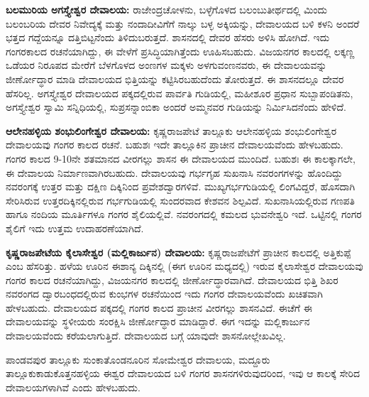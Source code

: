 \vskip -1pt

\textbf{ಬಲಮುರಿಯ ಅಗಸ್ತ್ಯೇಶ್ವರ ದೇವಾಲಯ:} ರಾಜೇಂದ್ರಚೋಳನು, ಬಳ್ಳೆಗೊಳದ ಬಲಂಬುತೀರ್ಥದಲ್ಲಿ ಮಿಂದು ಬಲಂಬರಿಯ ದೇವರ ನಿವೇದ್ಯಕ್ಕೆ ಮತ್ತು ನಂದಾದೀವಿಗೆಗೆ ನಾಲ್ಕು ಬಳ್ಳ ಅಕ್ಕಿಯನ್ನು, ದೇವಾಲಯದ ಬಳಿ ಕಳನಿ ಅಂದರೆ ಭತ್ತದ ಗದ್ದೆಯನ್ನೂ ದತ್ತಿಬಿಟ್ಟನೆಂದು ತಿಳಿದುಬರುತ್ತದೆ. ಶಾಸನದಲ್ಲಿ ದೇವರ ಹೆಸರು ಅಳಿಸಿ ಹೋಗಿದೆ. ಇದು ಗಂಗರಕಾಲದ ರಚನೆಯಾಗಿದ್ದು, ಈ ವೇಳೆಗೆ ಪ್ರಸಿದ್ಧಿಯಾಗಿತ್ತೆಂದು ಊಹಿಸಬಹುದು. ವಿಜಯನಗರ ಕಾಲದಲ್ಲಿ ಲಕ್ಕಣ್ಣ ಒಡೆಯರ ನಿರೂಪದ ಮೇರೆಗೆ ಬೆಳಗೊಳದ ಅಂಣಗಳ ಮಕ್ಕಳು ಅಳಗುವಂಣನವರು, ಈ ದೇವಾಲಯವನ್ನು ಜೀರ್ಣೋದ್ಧಾರ ಮಾಡಿ ದೇವಾಲಯದ ಭಿತ್ತಿಯನ್ನು ಕಟ್ಟಿಸಿರಬಹುದೆಂದು ತೋರುತ್ತದೆ. ಈ ಶಾಸನದಲ್ಲೂ ದೇವರ ಹೆಸರಿಲ್ಲ. ಅಗಸ್ತ್ಯೇಶ್ವರ ದೇವಾಲಯದ ಪಕ್ಕದಲ್ಲಿರುವ ಪಾರ್ವತಿ ಗುಡಿಯಲ್ಲಿ, ಮಹೀಶೂರ ಪ್ರಧಾನ ಸುಬ್ಬಾಪಂಡಿತನು, ಅಗಸ್ತ್ಯೇಶ್ವರ ಸ್ವಾಮಿ ಸನ್ನಿಧಿಯಲ್ಲಿ, ಸುಪ್ರಸನ್ನಾಂಬಿಕಾ ಅಂದರೆ ಅಮ್ಮನವರ ಗುಡಿಯನ್ನು ನಿರ್ಮಿಸಿದನೆಂದು ಹೇಳಿದೆ.

\vskip -1pt

\textbf{ಆಲೇನಹಳ್ಳಿಯ ಶಂಭುಲಿಂಗೇಶ್ವರ ದೇವಾಲಯ:} ಕೃಷ್ಣರಾಜಪೇಟೆ ತಾಲ್ಲೂಕು ಆಲೇನಹಳ್ಳಿಯ ಶಂಭುಲಿಂಗೇಶ್ವರ ದೇವಾಲಯವು ಗಂಗರ ಕಾಲದ ರಚನೆ. ಬಹುಶಃ ಇದೇ ತಾಲ್ಲೂಕಿನ ಪ್ರಾಚೀನ ದೇವಾಲಯವೆಂದು ಹೇಳಬಹುದು. ಗಂಗರ ಕಾಲದ 9-10ನೇ ಶತಮಾನದ ವೀರಗಲ್ಲು ಶಾಸನ ಈ ದೇವಾಲಯದ ಮುಂದಿದೆ. ಬಹುಶಃ ಈ ಕಾಲಕ್ಕಾಗಲೇ, ಈ ದೇವಾಲಯ ನಿರ್ಮಾಣವಾಗಿರಬಹುದು. ದೇವಾಲಯವು ಗರ್ಭಗೃಹ ಸುಖನಾಸಿ ನವರಂಗಗಳನ್ನು ಹೊಂದಿದ್ದು ನವರಂಗಕ್ಕೆ ಉತ್ತರ ಮತ್ತು ದಕ್ಷಿಣ ದಿಕ್ಕಿನಿಂದ ಪ್ರವೇಶದ್ವಾರಗಳಿವೆ. ಮುಖ್ಯಗರ್ಭಗುಡಿಯಲ್ಲಿ ಲಿಂಗವಿದ್ದರೆ, ಹೊಸದಾಗಿ ಸೇರಿಸಿರುವ ಉತ್ತರದಿಕ್ಕಿನಲ್ಲಿರುವ ಗರ್ಭಗುಡಿಯಲ್ಲಿ ಸುಂದರವಾದ ಕೇಶವನ ಶಿಲ್ಪವಿದೆ. ಸುಖನಾಸಿಯಲ್ಲಿರುವ ಗಣಪತಿ ಹಾಗೂ ನಂದಿಯ ಮೂರ್ತಿಗಳೂ ಗಂಗರ ಶೈಲಿಯಲ್ಲಿವೆ. ನವರಂಗದಲ್ಲಿ ಕಮಲದ ಭುವನೇಶ್ವರಿ ಇದೆ. ಒಟ್ಟಿನಲ್ಲಿ ಗಂಗರ ಶೈಲಿಗೆ ಇದು ಉತ್ತಮ ಉದಾಹರಣೆಯಾಗಿದೆ.

\vskip -1pt

\textbf{ಕೃಷ್ಣರಾಜಪೇಟೆಯ ಕೈಲಾಸೇಶ್ವರ (ಮಲ್ಲಿಕಾರ್ಜುನ) ದೇವಾಲಯ:} ಕೃಷ್ಣರಾಜಪೇಟೆಗೆ ಪ್ರಾಚೀನ ಕಾಲದಲ್ಲಿ ಅತ್ತಿಕುಪ್ಪೆ ಎಂಬ ಹೆಸರಿತ್ತು. ಹಳೆಯ ಊರಿನ ಈಶಾನ್ಯ ದಿಕ್ಕಿನಲ್ಲಿ (ಈಗ ಊರಿನ ಮಧ್ಯದಲ್ಲಿ) ಇರುವ ಕೈಲಾಸೇಶ್ವರ ದೇವಾಲಯವು ಗಂಗರ ಕಾಲದ ರಚನೆಯಾಗಿದ್ದು, ವಿಜಯನಗರ ಕಾಲದಲ್ಲಿ ಜೀರ್ಣೋದ್ಧಾರವಾಗಿದೆ. ದೇವಾಲಯದ ಭಿತ್ತಿ ಶಿಖರ ನವರಂಗದ ದ್ವಾರಬಂಧದಲ್ಲಿರುವ ಕುಂಭಗಳ ರಚನೆಯಿಂದ ಇದು ಗಂಗರ ದೇವಾಲಯವೆಂದು ಖಚಿತವಾಗಿ ಹೇಳಬಹುದು. ದೇವಾಲಯದ ಪಕ್ಕದಲ್ಲಿ ಗಂಗರ ಕಾಲದ ಪ್ರಾಚೀನ ವೀರಗಲ್ಲು ಶಾಸನವಿದೆ. ಈಚೆಗೆ ಈ ದೇವಾಲಯವನ್ನು ಸ್ಥಳೀಯರು ಸಂರಕ್ಷಿಸಿ ಜೀರ್ಣೋದ್ಧಾರ ಮಾಡಿದ್ದಾರೆ. ಈಗ ಇದನ್ನು ಮಲ್ಲಿಕಾರ್ಜುನ ದೇವಾಲಯವೆಂದು ಕರೆಯಲಾಗುತ್ತಿದೆ. ದೇವಾಲಯದ ಬಗ್ಗೆ ಯಾವುದೇ ಶಾಸನೋಲ್ಲೇಖವಿಲ್ಲ.

\vskip -1pt

ಪಾಂಡವಪುರ ತಾಲ್ಲೂಕು ಸುಂಕಾತೊಂಡನೂರಿನ ಸೋಮೇಶ್ವರ ದೇವಾಲಯ, ಮದ್ದೂರು ತಾಲ್ಲೂಕು\break ಕಾಡುಕೊತ್ತನಹಳ್ಳಿಯ ಈಶ್ವರ ದೇವಾಲಯದ ಬಳಿ ಗಂಗರ ಶಾಸನಗಳಿರುವುದರಿಂದ, ಇವು ಆ ಕಾಲಕ್ಕೆ ಸೇರಿದ ದೇವಾಲಯ\-ಗಳಾಗಿವೆ ಎಂದು ಹೇಳಬಹುದು.

